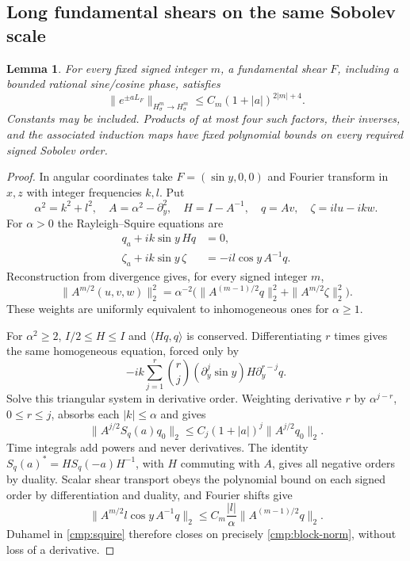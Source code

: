 \documentclass[11pt,a4paper]{amsart}
\newtheorem{lemma}[theorem]{Lemma}
\theoremstyle{definition}
\theoremstyle{remark}
\numberwithin{equation}{section}
\begin{document}
\subsection{Long fundamental shears on the same Sobolev scale}
\label{cmp:longshear}

\begin{lemma}\label{cmp:shear-bound}
For every fixed signed integer $m$, a fundamental shear $F$, including a
bounded rational sine/cosine phase, satisfies
\[
 \|e^{\pm aL_F}\|_{H^m_\sigma\to H^m_\sigma}
 \le C_m(1+|a|)^{2|m|+4}.
\]
Constants may be included. Products of at most four such factors, their
inverses, and the associated induction maps have fixed polynomial bounds
on every required signed Sobolev order.
\end{lemma}
\begin{proof}
In angular coordinates take $F=(\sin y,0,0)$ and Fourier transform in $x,z$
with integer frequencies $k,l$. Put
\[
 \alpha^2=k^2+l^2,\quad A=\alpha^2-\partial_y^2,
 \quad H=I-A^{-1},\quad q=Av,\quad \zeta=il u-ik w.
\]
For $\alpha>0$ the Rayleigh--Squire equations are
\begin{align}
 q_a+ik\sin y\,Hq&=0,\label{cmp:rayleigh}\\
 \zeta_a+ik\sin y\,\zeta&=-il\cos y\,A^{-1}q.
 \label{cmp:squire}
\end{align}
Reconstruction from divergence gives, for every signed integer $m$,
\begin{equation}
 \|A^{m/2}(u,v,w)\|_2^2
 =\alpha^{-2}\bigl(\|A^{(m-1)/2}q\|_2^2+
                         \|A^{m/2}\zeta\|_2^2\bigr).
 \label{cmp:block-norm}
\end{equation}
These weights are uniformly equivalent to inhomogeneous ones for
$\alpha\ge1$.

For $\alpha^2\ge2$, $I/2\le H\le I$ and $\langle Hq,q\rangle$ is
conserved. Differentiating $r$ times gives the same homogeneous equation,
forced only by
\[
 -ik\sum_{j=1}^r\binom rj(\partial_y^j\sin y)
                                      H\partial_y^{r-j}q.
\]
Solve this triangular system in derivative order. Weighting derivative
$r$ by $\alpha^{j-r}$, $0\le r\le j$, absorbs each $|k|\le\alpha$ and gives
\begin{equation}
 \|A^{j/2}S_q(a)q_0\|_2
 \le C_j(1+|a|)^j\|A^{j/2}q_0\|_2.\label{cmp:q-positive}
\end{equation}
Time integrals add powers and never derivatives. The identity
$S_q(a)^*=H S_q(-a)H^{-1}$, with $H$ commuting with $A$, gives all negative
orders by duality. Scalar shear transport obeys the polynomial bound on
each signed order by differentiation and duality, and Fourier shifts give
\begin{equation}
 \|A^{m/2}l\cos y\,A^{-1}q\|_2
 \le C_m\frac{|l|}{\alpha}\|A^{(m-1)/2}q\|_2.
 \label{cmp:squire-source}
\end{equation}
Duhamel in \eqref{cmp:squire} therefore closes on precisely
\eqref{cmp:block-norm}, without loss of a derivative.


\end{proof}
\end{document}
